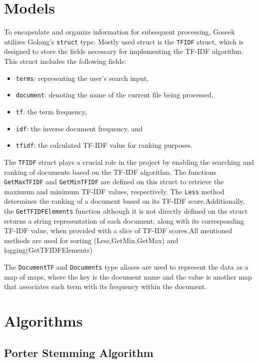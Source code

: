     \section{Models}
    To encapsulate and organize information for subsequent processing, Goseek utilizes Golang's \texttt{struct}\cite{golang} type. Mostly used struct is the \texttt{TFIDF} struct, which is designed to store the fields necessary for implementing the TF-IDF algorithm\cite{wikipedia_tf_idf}. This struct includes the following fields:

\begin{itemize}
    \item \texttt{terms}: representing the user's search input,
    \item \texttt{document}: denoting the name of the current file being processed,
    \item \texttt{tf}: the term frequency,
    \item \texttt{idf}: the inverse document frequency, and
    \item \texttt{tfidf}: the calculated TF-IDF value for ranking purposes.
\end{itemize}

The \texttt{TFIDF} struct plays a crucial role in the project by enabling the searching and ranking of documents based on the TF-IDF algorithm. The functions \texttt{GetMaxTFIDF} and \texttt{GetMinTFIDF} are defined on this struct to retrieve the maximum and minimum TF-IDF values, respectively. The \texttt{Less} method determines the ranking of a document based on its TF-IDF score.Additionally, the \texttt{GetTFIDFElements} function although it is not directly defined on the struct returns a string representation of each document, along with its corresponding TF-IDF value, when provided with a slice of TF-IDF scores.All mentioned methods are used for sorting (Less,GetMin,GetMax) and logging(GetTFIDFElements)

The \texttt{DocumentTF} and \texttt{Documents} type aliases are used to represent the data as a map of maps, where the key is the document name and the value is another map that associates each term with its frequency within the document.

\section{Algorithms}
\subsection{Porter Stemming Algorithm}


